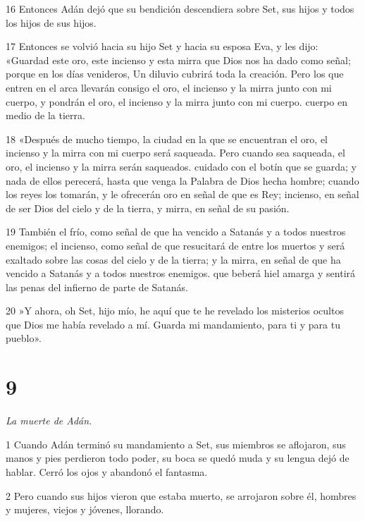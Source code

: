 \par 16 Entonces Adán dejó que su bendición descendiera sobre Set, sus hijos y todos los hijos de sus hijos.

\par 17 Entonces se volvió hacia su hijo Set y hacia su esposa Eva, y les dijo: «Guardad este oro, este incienso y esta mirra que Dios nos ha dado como señal; porque en los días venideros, Un diluvio cubrirá toda la creación. Pero los que entren en el arca llevarán consigo el oro, el incienso y la mirra junto con mi cuerpo, y pondrán el oro, el incienso y la mirra junto con mi cuerpo. cuerpo en medio de la tierra.

\par 18 «Después de mucho tiempo, la ciudad en la que se encuentran el oro, el incienso y la mirra con mi cuerpo será saqueada. Pero cuando sea saqueada, el oro, el incienso y la mirra serán saqueados. cuidado con el botín que se guarda; y nada de ellos perecerá, hasta que venga la Palabra de Dios hecha hombre; cuando los reyes los tomarán, y le ofrecerán oro en señal de que es Rey; incienso, en señal de ser Dios del cielo y de la tierra, y mirra, en señal de su pasión.

\par 19 También el frío, como señal de que ha vencido a Satanás y a todos nuestros enemigos; el incienso, como señal de que resucitará de entre los muertos y será exaltado sobre las cosas del cielo y de la tierra; y la mirra, en señal de que ha vencido a Satanás y a todos nuestros enemigos. que beberá hiel amarga y sentirá las penas del infierno de parte de Satanás.

\par 20 »Y ahora, oh Set, hijo mío, he aquí que te he revelado los misterios ocultos que Dios me había revelado a mí. Guarda mi mandamiento, para ti y para tu pueblo».

\chapter{9}

\par \textit{La muerte de Adán.}

\par 1 Cuando Adán terminó su mandamiento a Set, sus miembros se aflojaron, sus manos y pies perdieron todo poder, su boca se quedó muda y su lengua dejó de hablar. Cerró los ojos y abandonó el fantasma.

\par 2 Pero cuando sus hijos vieron que estaba muerto, se arrojaron sobre él, hombres y mujeres, viejos y jóvenes, llorando.


